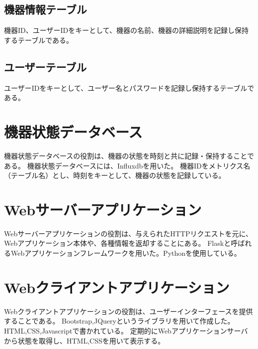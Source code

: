 \subsection{機器情報テーブル}
機器ID、ユーザーIDをキーとして、機器の名前、機器の詳細説明を記録し保持するテーブルである。
\subsection{ユーザーテーブル}
ユーザーIDをキーとして、ユーザー名とパスワードを記録し保持するテーブルである。

\section{機器状態データベース}
機器状態データベースの役割は、機器の状態を時刻と共に記録・保持することである。
機器状態データベースには、Influxdbを用いた。
機器IDをメトリクス名（テーブル名）とし、時刻をキーとして、機器の状態を記録している。

\section{Webサーバーアプリケーション}
Webサーバーアプリケーションの役割は、与えられたHTTPリクエストを元に、Webアプリケーション本体や、各種情報を返却することにある。
Flaskと呼ばれるWebアプリケーションフレームワークを用いた。Pythonを使用している。

\section{Webクライアントアプリケーション}
Webクライアントアプリケーションの役割は、ユーザーインターフェースを提供することである。
Bootstrap,JQueryというライブラリを用いて作成した。HTML,CSS,Javascriptで書かれている。
定期的にWebアプリケーションサーバから状態を取得し、HTML,CSSを用いて表示する。






